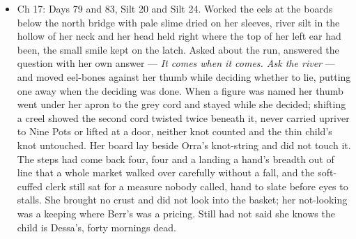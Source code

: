 \documentclass{design/chronicle}
\begin{document}
{\begin{itemize}[leftmargin=1.4em,itemsep=1pt,topsep=3pt,parsep=0pt]
\end{itemize}

\begin{itemize}[leftmargin=1.4em,itemsep=1pt,topsep=3pt,parsep=0pt]

\item Ch 17: Days 79 and 83, Silt 20 and Silt 24. Worked the eels at the boards below the north bridge with pale slime dried on her sleeves, river silt in the hollow of her neck and her head held right where the top of her left ear had been, the small smile kept on the latch. Asked about the run, answered the question with her own answer — \emph{It comes when it comes. Ask the river} — and moved eel-bones against her thumb while deciding whether to lie, putting one away when the deciding was done. When a figure was named her thumb went under her apron to the grey cord and stayed while she decided; shifting a creel showed the second cord twisted twice beneath it, never carried upriver to Nine Pots or lifted at a door, neither knot counted and the thin child’s knot untouched. Her board lay beside Orra’s knot-string and did not touch it. The steps had come back four, four and a landing a hand’s breadth out of line that a whole market walked over carefully without a fall, and the soft-cuffed clerk still sat for a measure nobody called, hand to slate before eyes to stalls. She brought no crust and did not look into the basket; her not-looking was a keeping where Berr’s was a pricing. Still had not said she knows the child is Dessa’s, forty mornings dead.

\end{itemize}

\begin{itemize}[leftmargin=1.4em,itemsep=1pt,topsep=3pt,parsep=0pt]


\end{itemize}}
\end{document}
